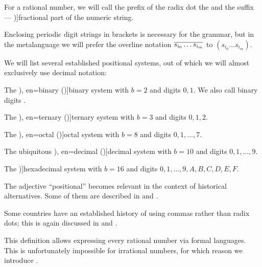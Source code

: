 \begin{definition}
  For a rational number, we will call the prefix of the radix dot the  and the suffix --- \term[en=fractional part (\cite[214]{Knuth1997ArtVol2})]{fractional part} of the numeric string.

  Enclosing periodic digit strings in brackets is necessary for the grammar, but in the metalanguage we will prefer the overline notation \( \oline{s_{i_0} \ldots s_{i_m}} \) to \( (s_{i_0} \ldots s_{i_m}) \).

  We will list several established positional systems, out of which we will almost exclusively use decimal notation:
  \begin{thmenum}
     The \term[ru=двоичная (система) (\cite[60]{Зорич2019АнализТом1}), en=binary (\cite[195]{Knuth1997ArtVol2})]{binary} system with \( b = 2 \) and digits \( 0, 1 \). We also call binary digits .

     The \term[ru=троичная (система) (\cite[60]{Зорич2019АнализТом1}), en=ternary (\cite[195]{Knuth1997ArtVol2})]{ternary} system with \( b = 3 \) and digits \( 0, 1, 2 \).

     The \term[ru=восьмичная (система) (\cite[60]{Зорич2019АнализТом1}), en=octal (\cite[\S 4.2.2]{Rosen2019DiscreteMathematics})]{octal} system with \( b = 8 \) and digits \( 0, 1, \ldots, 7 \).

     The ubiquitous \term[ru=десетичная (система) (\cite[60]{Зорич2019АнализТом1}), en=decimal (\cite[195]{Knuth1997ArtVol2})]{decimal} system with \( b = 10 \) and digits \( 0, 1, \ldots, 9 \).

     The \term[en=hexadecimal (\cite[195]{Knuth1997ArtVol2})]{hexadecimal} system with \( b = 16 \) and digits \( 0, 1, \ldots, 9, A, B, C, D, E, F \).
  \end{thmenum}
\end{definition}
\begin{comments}
  \item The adjective \enquote{positional} becomes relevant in the context of historical alternatives. Some of them are described in \cite[ch. 1]{АлександровМаркушевичХинчин1951ЭнциклопедияТом1} and \cite[sec. 4.1]{Knuth1997ArtVol2}.

  \item Some countries have an established history of using commas rather than radix dots; this is again discussed in \cite[ch. 1]{АлександровМаркушевичХинчин1951ЭнциклопедияТом1} and \cite[sec. 4.1]{Knuth1997ArtVol2}.

  \item This definition allows expressing every rational number via formal languages. This is unfortunately impossible for irrational numbers, for which reason we introduce .
\end{comments}

